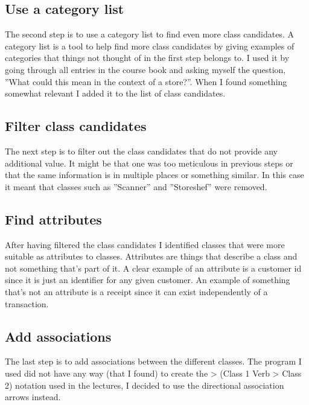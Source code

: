 \documentclass[a4paper]{scrreprt}
\begin{document}
        \subsection{Use a category list}
            The second step is to use a category list to find even more class
            candidates. A category list is a tool to help find more class candidates by
            giving examples of categories that things not thought of in the first
            step belongs to. I used it by going through all entries in the course book
            and asking myself the question, ''What could this mean in the context of a
            store?''. When I found something somewhat relevant I added it to the list of
            class candidates.
        
        \subsection{Filter class candidates}
            The next step is to filter out the class candidates that do not
            provide any additional value. It might be that one was too meticulous
            in previous steps or that the same information is in multiple places
            or something similar. In this case it meant that classes such as 
            ''Scanner'' and ''Storeshef'' were removed.

        \subsection{Find attributes}
            After having filtered the class candidates I identified classes that
            were more suitable as attributes to classes. Attributes are things 
            that describe a class and not something that's part of it. A clear example
            of an attribute is a customer id since it is just an identifier for any
            given customer. An example of something that's not an attribute is a
            receipt since it can exist independently of a transaction.

        \subsection{Add associations}
            The last step is to add associations between the different classes.
            The program I used did not have any way (that I found) to create
            the > (Class 1 Verb > Class 2) notation used in the lectures, I
            decided to use the directional association arrows instead. 
\end{document}
